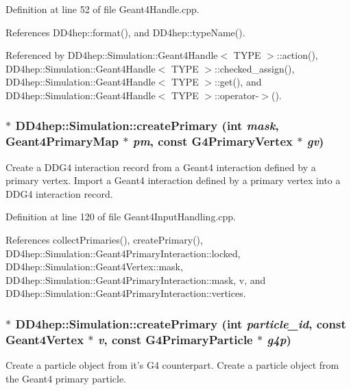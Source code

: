 Definition at line 52 of file Geant4Handle.cpp.

References DD4hep::format(), and DD4hep::typeName().

Referenced by DD4hep::Simulation::Geant4Handle$<$ TYPE $>$::action(), DD4hep::Simulation::Geant4Handle$<$ TYPE $>$::checked\_\-assign(), DD4hep::Simulation::Geant4Handle$<$ TYPE $>$::get(), and DD4hep::Simulation::Geant4Handle$<$ TYPE $>$::operator-\/$>$().\hypertarget{namespace_d_d4hep_1_1_simulation_a36acd8dbd545f60bf3b6c7f06209898e}{
\subsubsection[{createPrimary}]{ $\ast$ DD4hep::Simulation::createPrimary (int {\em mask}, \/  {\bf Geant4PrimaryMap} $\ast$ {\em pm}, \/  const G4PrimaryVertex $\ast$ {\em gv})}}
\label{namespace_d_d4hep_1_1_simulation_a36acd8dbd545f60bf3b6c7f06209898e}


Create a DDG4 interaction record from a Geant4 interaction defined by a primary vertex. Import a Geant4 interaction defined by a primary vertex into a DDG4 interaction record. 

Definition at line 120 of file Geant4InputHandling.cpp.

References collectPrimaries(), createPrimary(), DD4hep::Simulation::Geant4PrimaryInteraction::locked, DD4hep::Simulation::Geant4Vertex::mask, DD4hep::Simulation::Geant4PrimaryInteraction::mask, v, and DD4hep::Simulation::Geant4PrimaryInteraction::vertices.\hypertarget{namespace_d_d4hep_1_1_simulation_a4ba463edde87d20831a604346d29a129}{
\subsubsection[{createPrimary}]{ $\ast$ DD4hep::Simulation::createPrimary (int {\em particle\_\-id}, \/  const {\bf Geant4Vertex} $\ast$ {\em v}, \/  const G4PrimaryParticle $\ast$ {\em g4p})}}
\label{namespace_d_d4hep_1_1_simulation_a4ba463edde87d20831a604346d29a129}


Create a particle object from it's G4 counterpart. Create a particle object from the Geant4 primary particle. 

